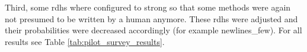 \documentclass[%
class=scrreprt,
chapterprefix=false,%
open=right,%
twoside=false,%
paper=a4,%
logofile={Logo\_zentral\_farbig\_EN.png},%
thesistype=master,%
UKenglish,%
]{se2thesis}
\begin{document}
	Third, some rdhs where configured to strong so that some methods were again not presumed to be written by a human anymore. These rdhs were adjusted and their probabilities were decreased accordingly (for example newlines\_few). For all results see Table \ref{tab:pilot_survey_results}.

\end{document}

